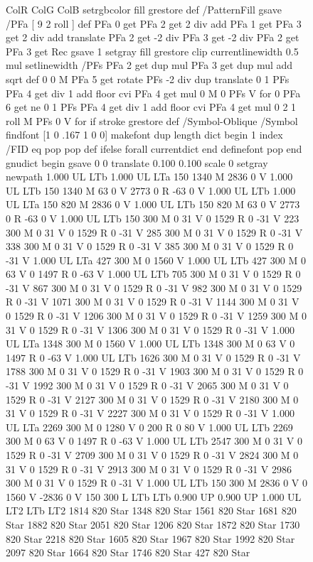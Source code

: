 \documentclass{LMCS}
\begin{document}
\begin{figure}[!tbp]
\begin{minipage}[b]{.47\linewidth}
{{{{  ColR ColG ColB setrgbcolor
  fill grestore } def
/PatternFill { gsave /PFa [ 9 2 roll ] def
    PFa 0 get PFa 2 get 2 div add PFa 1 get PFa 3 get 2 div add translate
    PFa 2 get -2 div PFa 3 get -2 div PFa 2 get PFa 3 get Rec
    gsave 1 setgray fill grestore clip
    currentlinewidth 0.5 mul setlinewidth
    /PFs PFa 2 get dup mul PFa 3 get dup mul add sqrt def
    0 0 M PFa 5 get rotate PFs -2 div dup translate
	0 1 PFs PFa 4 get div 1 add floor cvi
	{ PFa 4 get mul 0 M 0 PFs V } for
    0 PFa 6 get ne {
	0 1 PFs PFa 4 get div 1 add floor cvi
	{ PFa 4 get mul 0 2 1 roll M PFs 0 V } for
    } if
    stroke grestore } def
/Symbol-Oblique /Symbol findfont [1 0 .167 1 0 0] makefont
dup length dict begin {1 index /FID eq {pop pop} {def} ifelse} forall
currentdict end definefont pop
end
gnudict begin
gsave
0 0 translate
0.100 0.100 scale
0 setgray
newpath
1.000 UL
LTb
1.000 UL
LTa
150 1340 M
2836 0 V
1.000 UL
LTb
150 1340 M
63 0 V
2773 0 R
-63 0 V
1.000 UL
LTb
1.000 UL
LTa
150 820 M
2836 0 V
1.000 UL
LTb
150 820 M
63 0 V
2773 0 R
-63 0 V
1.000 UL
LTb
150 300 M
0 31 V
0 1529 R
0 -31 V
223 300 M
0 31 V
0 1529 R
0 -31 V
285 300 M
0 31 V
0 1529 R
0 -31 V
338 300 M
0 31 V
0 1529 R
0 -31 V
385 300 M
0 31 V
0 1529 R
0 -31 V
1.000 UL
LTa
427 300 M
0 1560 V
1.000 UL
LTb
427 300 M
0 63 V
0 1497 R
0 -63 V
1.000 UL
LTb
705 300 M
0 31 V
0 1529 R
0 -31 V
867 300 M
0 31 V
0 1529 R
0 -31 V
982 300 M
0 31 V
0 1529 R
0 -31 V
1071 300 M
0 31 V
0 1529 R
0 -31 V
1144 300 M
0 31 V
0 1529 R
0 -31 V
1206 300 M
0 31 V
0 1529 R
0 -31 V
1259 300 M
0 31 V
0 1529 R
0 -31 V
1306 300 M
0 31 V
0 1529 R
0 -31 V
1.000 UL
LTa
1348 300 M
0 1560 V
1.000 UL
LTb
1348 300 M
0 63 V
0 1497 R
0 -63 V
1.000 UL
LTb
1626 300 M
0 31 V
0 1529 R
0 -31 V
1788 300 M
0 31 V
0 1529 R
0 -31 V
1903 300 M
0 31 V
0 1529 R
0 -31 V
1992 300 M
0 31 V
0 1529 R
0 -31 V
2065 300 M
0 31 V
0 1529 R
0 -31 V
2127 300 M
0 31 V
0 1529 R
0 -31 V
2180 300 M
0 31 V
0 1529 R
0 -31 V
2227 300 M
0 31 V
0 1529 R
0 -31 V
1.000 UL
LTa
2269 300 M
0 1280 V
0 200 R
0 80 V
1.000 UL
LTb
2269 300 M
0 63 V
0 1497 R
0 -63 V
1.000 UL
LTb
2547 300 M
0 31 V
0 1529 R
0 -31 V
2709 300 M
0 31 V
0 1529 R
0 -31 V
2824 300 M
0 31 V
0 1529 R
0 -31 V
2913 300 M
0 31 V
0 1529 R
0 -31 V
2986 300 M
0 31 V
0 1529 R
0 -31 V
1.000 UL
LTb
150 300 M
2836 0 V
0 1560 V
-2836 0 V
150 300 L
LTb
LTb
0.900 UP
0.900 UP
1.000 UL
LT2
LTb
LT2
1814 820 Star
1348 820 Star
1561 820 Star
1681 820 Star
1882 820 Star
2051 820 Star
1206 820 Star
1872 820 Star
1730 820 Star
2218 820 Star
1605 820 Star
1967 820 Star
1992 820 Star
2097 820 Star
1664 820 Star
1746 820 Star
427 820 Star
}}}
\end{minipage}
\end{figure}
\end{document}
